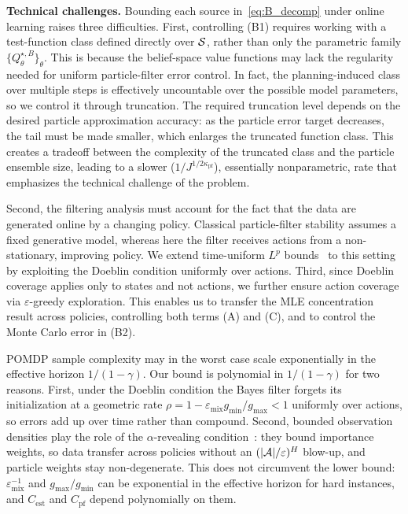 \textbf{Technical challenges.} Bounding each source in~\eqref{eq:B_decomp} under online learning raises three difficulties. First, controlling (B1) requires working with a test-function class defined directly over ${\mathcal{S}}$, rather than only the parametric family $\{Q^{\star,B}_\theta\}_\theta$. This is because the belief-space value functions may lack the regularity needed for uniform particle-filter error control. In fact, the planning-induced class over multiple steps is effectively uncountable over the possible model parameters, so we control it through truncation. The required truncation level depends on the desired particle approximation accuracy: as the particle error target decreases, the tail must be made smaller, which enlarges the truncated function class. This creates a tradeoff between the complexity of the truncated class and the particle ensemble size, leading to a slower ($1/J^{1/2\kappa_{\mathrm{pf}}}$), essentially nonparametric, rate that emphasizes the technical challenge of the problem.

Second, the filtering analysis must account for the fact that the data are generated online by a changing policy. Classical particle-filter stability assumes a fixed generative model, whereas here the filter receives actions from a non-stationary, improving policy. We extend time-uniform $L^p$ bounds~\citep{delMoral04} to this setting by exploiting the Doeblin condition uniformly over actions. Third, since Doeblin coverage applies only to states and not actions, we further ensure action coverage via $\varepsilon$-greedy exploration. This enables us to transfer the MLE concentration result across policies, controlling both terms (A) and (C), and to control the Monte Carlo error in (B2).

\begin{rmk}
POMDP sample complexity may in the worst case scale exponentially in the effective horizon $1/(1-\gamma)$.
Our bound is polynomial in $1/(1-\gamma)$ for two reasons.
First, under the Doeblin condition the Bayes filter forgets its initialization at a geometric rate $\rho=1-\varepsilon_{\mathrm{mix}}g_{\min}/g_{\max}<1$ uniformly over actions, so errors add up over time rather than compound.
Second, bounded observation densities play the role of the $\alpha$-revealing condition~\citep{liu2022partially}: they bound importance weights, so data transfer across policies without an $(|{\mathcal{A}}|/\varepsilon)^{H}$ blow-up, and particle weights stay non-degenerate.
This does not circumvent the lower bound: $\varepsilon_{\mathrm{mix}}^{-1}$ and $g_{\max}/g_{\min}$ can be exponential in the effective horizon for hard instances, and $C_{\mathrm{est}}$ and $C_{\mathrm{pf}}$ depend polynomially on them.
\end{rmk}

